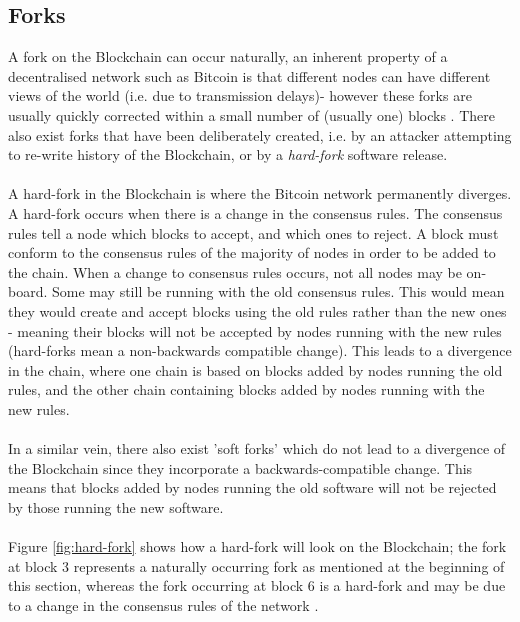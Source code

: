 \subsection{Forks}\label{background-forks}
A fork on the Blockchain can occur naturally, an inherent property of a decentralised network such as Bitcoin is that different nodes can have different views of the world (i.e. due to transmission delays)- however these forks are usually quickly corrected within a small number of (usually one) blocks \cite{RefWorks:doc:5c39e80ae4b0854ae611b047}. There also exist forks that have been deliberately created, i.e. by an attacker attempting to re-write history of the Blockchain, or by a \textit{hard-fork} software release. 
\\\\
A hard-fork in the Blockchain is where the Bitcoin network permanently diverges. A hard-fork occurs when there is a change in the consensus rules. The consensus rules tell a node which blocks to accept, and which ones to reject. A block must conform to the consensus rules of the majority of nodes in order to be added to the chain. When a change to consensus rules occurs, not all nodes may be on-board. Some may still be running with the old consensus rules. This would mean they would create and accept blocks using the old rules rather than the new ones - meaning their blocks will not be accepted by nodes running with the new rules (hard-forks mean a non-backwards compatible change). This leads to a divergence in the chain, where one chain is based on blocks added by nodes running the old rules, and the other chain containing blocks added by nodes running with the new rules. 
\\\\
In a similar vein, there also exist 'soft forks' which do not lead to a divergence of the Blockchain since they incorporate a backwards-compatible change. This means that blocks added by nodes running the old software will not be rejected by those running the new software. 
\\\\
Figure \ref{fig:hard-fork} shows how a hard-fork will look on the Blockchain; the fork at block 3 represents a naturally occurring fork as mentioned at the beginning of this section, whereas the fork occurring at block 6 is a hard-fork and may be due to a change in the consensus rules of the network \cite{RefWorks:doc:5c39e80ae4b0854ae611b047}. 

